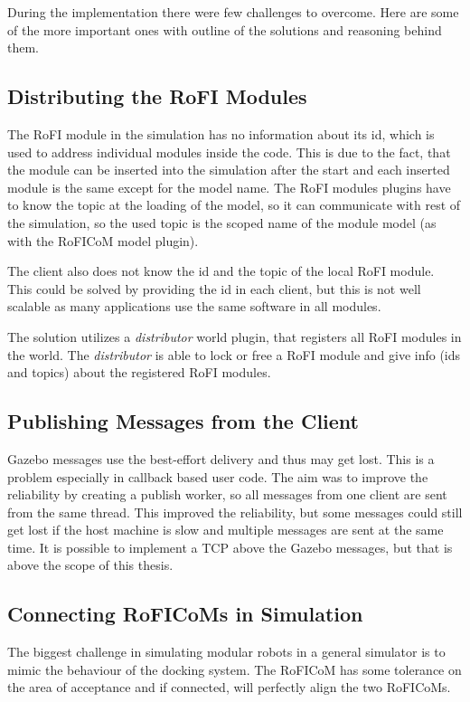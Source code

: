 \documentclass[
  digital, %
  table,   %
  oneside, %
  nolof,     %
  nolot,     %
]{fithesis3}
\begin{document}
During the implementation there were few challenges to overcome.
Here are some of the more important ones with outline of the solutions and reasoning behind them.

\subsection{Distributing the RoFI Modules}

The RoFI module in the simulation has no information about its id, which is used to address individual modules inside the code.
This is due to the fact, that the module can be inserted into the simulation after the start and each inserted module is the same except for the model name.
The RoFI modules plugins have to know the topic at the loading of the model, so it can communicate with rest of the simulation, so the used topic is the scoped name of the module model (as with the RoFICoM model plugin).

The client also does not know the id and the topic of the local RoFI module.
This could be solved by providing the id in each client, but this is not well scalable as many applications use the same software in all modules.

The solution utilizes a \emph{distributor} world plugin, that registers all RoFI modules in the world.
The \emph{distributor} is able to lock or free a RoFI module and give info (ids and topics) about the registered RoFI modules.

\subsection{Publishing Messages from the Client}

Gazebo messages use the best-effort delivery and thus may get lost.
This is a problem especially in callback based user code.
The aim was to improve the reliability by creating a publish worker, so all messages from one client are sent from the same thread.
This improved the reliability, but some messages could still get lost if the host machine is slow and multiple messages are sent at the same time.
It is possible to implement a TCP above the Gazebo messages, but that is above the scope of this thesis.

\subsection{Connecting RoFICoMs in Simulation}

The biggest challenge in simulating modular robots in a general simulator is to mimic the behaviour of the docking system.
The RoFICoM has some tolerance\cite{roficom} on the area of acceptance and if connected, will perfectly align the two RoFICoMs.
\end{document}
